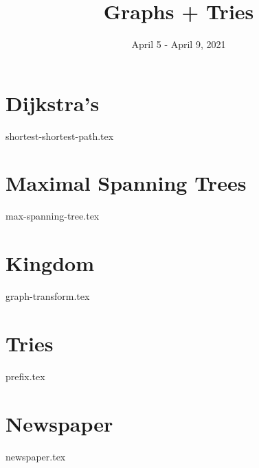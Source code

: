 \documentclass[11pt]{exam}
\title{Graphs + Tries}
\date{April 5 - April 9, 2021}
\begin{document}
\maketitle

\section{Dijkstra's}
\begin{questions}
{shortest-shortest-path.tex}
\end{questions}

\pagebreak
\section{Maximal Spanning Trees}
\begin{questions}
{max-spanning-tree.tex}
\end{questions}

\pagebreak
\section{Kingdom}
\begin{questions}
{graph-transform.tex}
\end{questions}


\pagebreak
\section{Tries}
\begin{questions}
{prefix.tex}
\end{questions}

\pagebreak
\section{Newspaper}
\begin{questions}
{newspaper.tex}
\end{questions}
\end{document}
